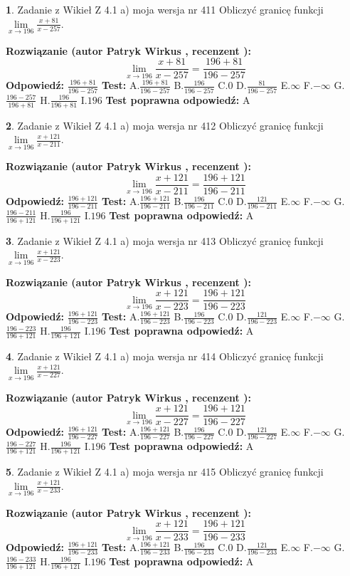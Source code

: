 \documentclass[12pt, a4paper]{article}
\theoremstyle{definition} %
\newtheorem{zad}{}
\newcommand{\zadStart}[1]{\begin{zad}#1\newline}
\newcommand{\zadStop}{\end{zad}}
\newcommand{\rozwStart}[2]{\noindent \textbf{Rozwiązanie (autor #1 , recenzent #2): }\newline}
\newcommand{\rozwStop}{\newline}
\newcommand{\odpStart}{\noindent \textbf{Odpowiedź:}\newline}
\newcommand{\odpStop}{\newline}
\newcommand{\testStart}{\noindent \textbf{Test:}\newline}
\newcommand{\testStop}{\newline}
\newcommand{\kluczStart}{\noindent \textbf{Test poprawna odpowiedź:}\newline}
\newcommand{\kluczStop}{\newline}
\begin{document}
\zadStart{Zadanie z Wikieł Z 4.1 a) moja wersja nr 411}
Obliczyć granicę funkcji $\lim\limits_{x\to196}\frac{x+81}{x-257}$.
\zadStop
\rozwStart{Patryk Wirkus}{}
$$\lim\limits_{x\to196}\frac{x+81}{x-257} = \frac{196+81}{196-257}$$
\rozwStop
\odpStart
$\frac{196+81}{196-257}$
\odpStop
\testStart
A.$\frac{196+81}{196-257}$
B.$\frac{196}{196-257}$
C.$0$
D.$\frac{81}{196-257}$
E.$\infty$
F.$-\infty$
G.$\frac{196-257}{196+81}$
H.$\frac{196}{196+81}$
I.$196$
\testStop
\kluczStart
A
\kluczStop



\zadStart{Zadanie z Wikieł Z 4.1 a) moja wersja nr 412}
Obliczyć granicę funkcji $\lim\limits_{x\to196}\frac{x+121}{x-211}$.
\zadStop
\rozwStart{Patryk Wirkus}{}
$$\lim\limits_{x\to196}\frac{x+121}{x-211} = \frac{196+121}{196-211}$$
\rozwStop
\odpStart
$\frac{196+121}{196-211}$
\odpStop
\testStart
A.$\frac{196+121}{196-211}$
B.$\frac{196}{196-211}$
C.$0$
D.$\frac{121}{196-211}$
E.$\infty$
F.$-\infty$
G.$\frac{196-211}{196+121}$
H.$\frac{196}{196+121}$
I.$196$
\testStop
\kluczStart
A
\kluczStop



\zadStart{Zadanie z Wikieł Z 4.1 a) moja wersja nr 413}
Obliczyć granicę funkcji $\lim\limits_{x\to196}\frac{x+121}{x-223}$.
\zadStop
\rozwStart{Patryk Wirkus}{}
$$\lim\limits_{x\to196}\frac{x+121}{x-223} = \frac{196+121}{196-223}$$
\rozwStop
\odpStart
$\frac{196+121}{196-223}$
\odpStop
\testStart
A.$\frac{196+121}{196-223}$
B.$\frac{196}{196-223}$
C.$0$
D.$\frac{121}{196-223}$
E.$\infty$
F.$-\infty$
G.$\frac{196-223}{196+121}$
H.$\frac{196}{196+121}$
I.$196$
\testStop
\kluczStart
A
\kluczStop



\zadStart{Zadanie z Wikieł Z 4.1 a) moja wersja nr 414}
Obliczyć granicę funkcji $\lim\limits_{x\to196}\frac{x+121}{x-227}$.
\zadStop
\rozwStart{Patryk Wirkus}{}
$$\lim\limits_{x\to196}\frac{x+121}{x-227} = \frac{196+121}{196-227}$$
\rozwStop
\odpStart
$\frac{196+121}{196-227}$
\odpStop
\testStart
A.$\frac{196+121}{196-227}$
B.$\frac{196}{196-227}$
C.$0$
D.$\frac{121}{196-227}$
E.$\infty$
F.$-\infty$
G.$\frac{196-227}{196+121}$
H.$\frac{196}{196+121}$
I.$196$
\testStop
\kluczStart
A
\kluczStop



\zadStart{Zadanie z Wikieł Z 4.1 a) moja wersja nr 415}
Obliczyć granicę funkcji $\lim\limits_{x\to196}\frac{x+121}{x-233}$.
\zadStop
\rozwStart{Patryk Wirkus}{}
$$\lim\limits_{x\to196}\frac{x+121}{x-233} = \frac{196+121}{196-233}$$
\rozwStop
\odpStart
$\frac{196+121}{196-233}$
\odpStop
\testStart
A.$\frac{196+121}{196-233}$
B.$\frac{196}{196-233}$
C.$0$
D.$\frac{121}{196-233}$
E.$\infty$
F.$-\infty$
G.$\frac{196-233}{196+121}$
H.$\frac{196}{196+121}$
I.$196$
\testStop
\kluczStart
A
\kluczStop
\end{document}
